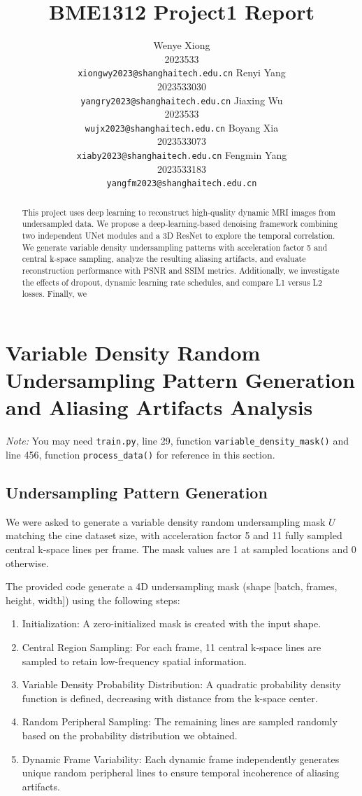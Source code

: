 \documentclass{article}
\title{BME1312 Project1 Report}
\author{%
  Wenye Xiong \\
  2023533 \\
  \texttt{xiongwy2023@shanghaitech.edu.cn}
  \And
  Renyi Yang \\
  2023533030 \\
  \texttt{yangry2023@shanghaitech.edu.cn}
  \AND
  Jiaxing Wu \\
  2023533 \\
  \texttt{wujx2023@shanghaitech.edu.cn}
  \And
  Boyang Xia \\
  2023533073 \\
  \texttt{xiaby2023@shanghaitech.edu.cn}
  \AND
  Fengmin Yang \\
  2023533183 \\
  \texttt{yangfm2023@shanghaitech.edu.cn}
}
\begin{document}
\maketitle


\begin{abstract}
  This project uses deep learning to reconstruct high-quality dynamic MRI images
  from undersampled data. We propose a deep-learning-based denoising framework combining
  two independent UNet modules and a 3D ResNet to explore the temporal correlation.
  We generate variable density undersampling patterns with acceleration factor 5 and
  central k-space sampling, analyze the resulting aliasing artifacts, and evaluate
  reconstruction performance with PSNR and SSIM metrics. Additionally,
  we investigate the effects of dropout, dynamic learning rate schedules,
  and compare L1 versus L2 losses. Finally, we %
\end{abstract}

\section{Variable Density Random Undersampling Pattern Generation and Aliasing Artifacts Analysis}
\textit{Note: }You may need \texttt{train.py}, line 29, function \texttt{variable\_density\_mask()}
and line 456, function \texttt{process\_data()} for reference in this section.

\subsection{Undersampling Pattern Generation}
We were asked to generate a variable density random undersampling mask $U$ matching the cine
dataset size, with acceleration factor 5 and 11 fully sampled central k-space lines per frame.
The mask values are 1 at sampled locations and 0 otherwise.

The provided code generate a 4D undersampling mask (shape [batch, frames, height, width]) using the following steps:
\begin{enumerate}
  \item Initialization: A zero-initialized mask is created with the input shape.
  \item Central Region Sampling: For each frame, 11 central k-space lines are
        sampled to retain low-frequency spatial information.
  \item Variable Density Probability Distribution: A quadratic probability density
        function is defined, decreasing with distance from the k-space center.
  \item Random Peripheral Sampling: The remaining lines are sampled randomly
        based on the probability distribution we obtained.
  \item Dynamic Frame Variability: Each dynamic frame independently generates
        unique random peripheral lines to ensure temporal incoherence of aliasing artifacts.
\end{enumerate}
\end{document}
